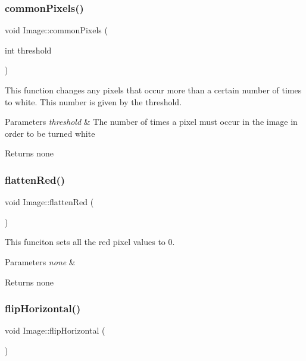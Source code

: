 \subsubsection{\texorpdfstring{common\+Pixels()}{commonPixels()}}
{\footnotesize\ttfamily void Image\+::common\+Pixels (\begin{DoxyParamCaption}\item[{int}]{threshold }\end{DoxyParamCaption})}

This function changes any pixels that occur more than a certain number of times to white. This number is given by the threshold.


\begin{DoxyParams}{Parameters}
{\em threshold} & The number of times a pixel must occur in the image in order to be turned white \\
\hline
\end{DoxyParams}
\begin{DoxyReturn}{Returns}
none 
\end{DoxyReturn}
\mbox{\label{class_image_a95fc031a2d406d17d6b4dadff743cf7c}} 
\subsubsection{\texorpdfstring{flatten\+Red()}{flattenRed()}}
{\footnotesize\ttfamily void Image\+::flatten\+Red (\begin{DoxyParamCaption}{ }\end{DoxyParamCaption})}

This funciton sets all the red pixel values to 0.


\begin{DoxyParams}{Parameters}
{\em none} & \\
\hline
\end{DoxyParams}
\begin{DoxyReturn}{Returns}
none 
\end{DoxyReturn}
\mbox{\label{class_image_a82d860b94ad3e5250fb077e063ce3fa6}} 
\subsubsection{\texorpdfstring{flip\+Horizontal()}{flipHorizontal()}}
{\footnotesize\ttfamily void Image\+::flip\+Horizontal (\begin{DoxyParamCaption}{ }\end{DoxyParamCaption})}

